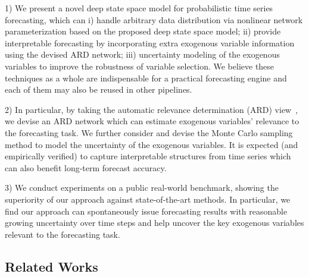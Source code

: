 \documentclass{article}
\begin{document}
1) We present a novel deep state space model for probabilistic time series forecasting, which can i) handle arbitrary data distribution via nonlinear network parameterization based on the proposed deep state space model; ii) provide interpretable forecasting by incorporating extra exogenous variable information using the devised ARD network; iii) uncertainty modeling of the exogenous variables to improve the robustness of variable selection. We believe these techniques as a whole are indispensable for a practical forecasting engine and each of them may also be reused in other pipelines.

2) In particular, by taking the automatic relevance determination (ARD) view~\cite{wipf2008new}, we devise an ARD network which can estimate exogenous variables' relevance to the forecasting task. We further consider and devise the Monte Carlo sampling method to model the uncertainty of the exogenous variables. It is expected (and empirically verified) to capture interpretable structures from time series which can also benefit long-term forecast accuracy.
 

3) We conduct experiments on a public real-world benchmark, showing the superiority of our approach against state-of-the-art methods. In particular, we find our approach can spontaneously issue forecasting results with reasonable growing uncertainty over time steps and help uncover the key exogenous variables relevant to the forecasting task.

\subsection{Related Works}
\end{document}
